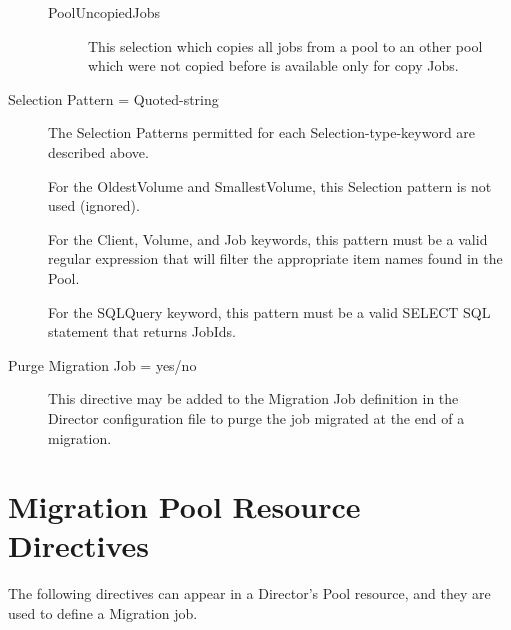 \begin{description}
\begin{description}
  \item [PoolUncopiedJobs] This selection which copies all jobs from a pool
        to an other pool which were not copied before is available only for copy Jobs.

  \end{description}

\item [Selection Pattern = \lt{}Quoted-string\gt{}]
  The Selection Patterns permitted for each Selection-type-keyword are
  described above.  

  For the OldestVolume and SmallestVolume, this
  Selection pattern is not used (ignored).  

  For the Client, Volume, and Job
  keywords, this pattern must be a valid regular expression that will filter
  the appropriate item names found in the Pool.

  For the SQLQuery keyword, this pattern must be a valid SELECT SQL statement
  that returns JobIds.

\item [ Purge Migration Job = \lt{}yes/no\gt{}]
  This directive may be added to the Migration Job definition in the Director
  configuration file to purge the job migrated at the end of a migration.

\end{description}

\section{Migration Pool Resource Directives}

The following directives can appear in a Director's Pool resource, and they
are used to define a Migration job.

